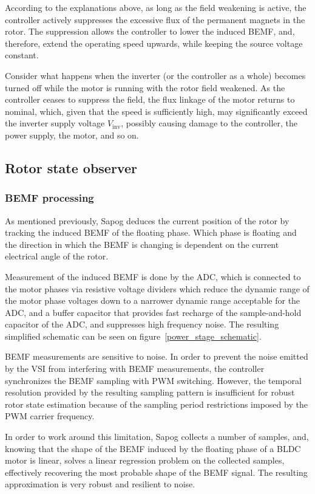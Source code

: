 \documentclass{zubaxdoc}
\begin{document}
According to the explanations above, as long as the field weakening is active,
the controller actively suppresses the excessive flux of the permanent magnets in the rotor.
The suppression allows the controller to lower the induced BEMF, and, therefore,
extend the operating speed upwards, while keeping the source voltage constant.

Consider what happens when the inverter (or the controller as a whole) becomes turned off while the
motor is running with the rotor field weakened.
As the controller ceases to suppress the field, the flux linkage of the motor returns to nominal,
which, given that the speed is sufficiently high, may significantly exceed the inverter supply
voltage $V_\text{inv}$, possibly causing damage to the controller, the power supply, the motor, and so on.

\subsection{Rotor state observer}

\subsubsection{BEMF processing}

As mentioned previously, Sapog deduces the current position of the rotor by tracking the induced BEMF
of the floating phase.
Which phase is floating and the direction in which the BEMF is changing is dependent on the current electrical
angle of the rotor.

Measurement of the induced BEMF is done by the ADC, which is connected to the motor phases via
resistive voltage dividers which reduce the dynamic range of the motor phase voltages down to a narrower
dynamic range acceptable for the ADC,
and a buffer capacitor that provides fast recharge of the sample-and-hold capacitor of the ADC,
and suppresses high frequency noise.
The resulting simplified schematic can be seen on figure~\ref{power_stage_schematic}.

BEMF measurements are sensitive to noise.
In order to prevent the noise emitted by the VSI from interfering with BEMF measurements,
the controller synchronizes the BEMF sampling with PWM switching.
However, the temporal resolution provided by the resulting sampling pattern is insufficient for robust
rotor state estimation because of the sampling period restrictions imposed by the
PWM carrier frequency.

In order to work around this limitation, Sapog collects a number of samples, and,
knowing that the shape of the BEMF induced by the floating phase of a BLDC motor is linear,
solves a linear regression problem on the collected samples, effectively recovering the most probable
shape of the BEMF signal.
The resulting approximation is very robust and resilient to noise.
\end{document}
